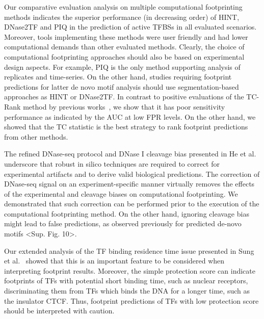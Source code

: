 Our comparative evaluation analysis on multiple computational footprinting methods indicates the superior performance (in decreasing order) of HINT, DNase2TF and PIQ in the prediction of active TFBSs in all evaluated scenarios. Moreover, tools implementing these methods were user friendly and had lower computational demands than other evaluated methods. Clearly, the choice of computational footprinting approaches should also be based on experimental design aspects. For example, PIQ is the only method supporting analysis of replicates and time-series. On the other hand, studies requiring footprint predictions for latter de novo motif analysis should use segmentation-based approaches as HINT or DNase2TF. In contrast to positive evaluations of the TC-Rank method by previous works~\cite{}, we show that it has poor sensitivity performance as indicated by the AUC at low FPR levels. On the other hand, we showed that the TC  statistic is the best strategy to rank footprint predictions from other methods.



The refined DNase-seq protocol and DNase I cleavage bias presented in He et al.~\cite{} underscore that robust in silico techniques are required to correct for experimental artifacts and to derive valid biological predictions. The correction of DNase-seq signal on an experiment-specific manner virtually removes the effects of the experimental and cleavage biases on computational footprinting. We demonstrated that such correction can be performed prior to the execution of the computational footprinting method. On the other hand, ignoring cleavage bias might lead to false predictions, as observed previously for predicted de-novo motifs <Sup. Fig. 10>.


Our extended analysis of the TF binding residence time issue presented in Sung et al.~\cite{} showed that this is an important feature to be considered when interpreting footprint results. Moreover, the simple protection score can indicate footprints of TFs with potential short binding time, such as nuclear receptors, discriminating them from TFs which binds the DNA for a longer time, such as the insulator CTCF. Thus, footprint predictions of TFs with low protection score should be interpreted with caution.

